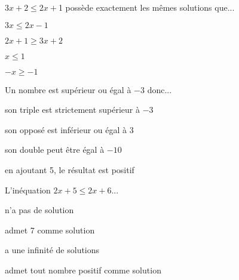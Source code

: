 \begin{QCM}
\begin{GroupeQCM}
     \begin{exercice}
      $3x+2 \leq 2x + $1 possède exactement les mêmes solutions que...
      \begin{ChoixQCM}{4}
      \item $3x\leq 2x-1$
      \item $2x+1 \geq 3x+2$
      \item $x\leq 1$
      \item $-x \geq -1$
      \end{ChoixQCM}
\begin{corrige}
   \end{corrige}
    \end{exercice}
    
    \begin{exercice}
      Un nombre est supérieur ou égal à $-3$ donc...
      \begin{ChoixQCM}{4}
      \item son triple est strictement supérieur 
à $-3$
      \item son opposé est inférieur 
ou égal à 3
      \item son double peut être égal à $-10$
      \item en ajoutant 5, le résultat 
est positif
      \end{ChoixQCM}
\begin{corrige}
   \end{corrige}
    \end{exercice}
    
        \begin{exercice}
      L'inéquation $2x + 5 \leq 2x + 6$...
      \begin{ChoixQCM}{4}
      \item n'a pas 
de solution
      \item admet 7 comme solution
      \item a une infinité de solutions
      \item admet tout nombre positif comme solution
      \end{ChoixQCM}
\begin{corrige}
   \end{corrige}
    \end{exercice}


\end{GroupeQCM}
\end{QCM}

  